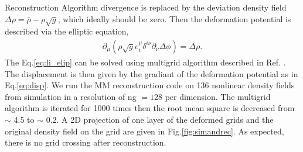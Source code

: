 \begin{section}{Reconstruction Algorithm}
  divergence is replaced by the deviation density field
  $\Delta \rho = \bar{\rho}-\rho \sqrt{g}$, which ideally should be
  zero.  Then the deformation potential is described via the elliptic
  equation,
  \begin{align}
    \label{eq:li_elip}
    \partial _\mu (\rho \sqrt{g} e^\mu _i \delta^{i\nu}\partial_\nu \Delta \phi)=\Delta \rho.
  \end{align}
  The Eq.\ref{eq:li_elip} can be solved using multigrid algorithm
  described in Ref.  \cite{bib:Pen1995,bib:Pen1998}.  The displacement
  is then given by the gradiant of the deformation potential as in
  Eq.\ref{eq:disp}. We run the MM reconstruction code on 136 nonlinear
  density fields from simulation in a resolution of ng $=128$ per
  dimension. The multigrid algorithm is iterated for 1000 times then
  the root mean square is decreased from $\sim$ 4.5 to $\sim$ 0.2.  A
  2D projection of one layer of the deformed grids and the original
  density field on the grid are given in Fig.\ref{fig:simandrec}.  As
  expected, there is no grid crossing after reconstruction.

\end{section}

